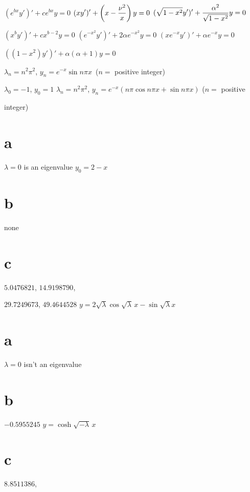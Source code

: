 \medskip

 $(e^{bx}y')'+ce^{bx}y=0$\;
 $\displaystyle{(xy')'+\left(x-\frac{\nu^{2}}{x}\right)y=0}$\;
 $\displaystyle{(\sqrt{1-x^{2}}y')'+\frac{\alpha^{2}}{\sqrt{1-x^{2}}}y=0}$

\smallskip

 $(x^{b}y')'+cx^{b-2}y=0$\;
 $(e^{-x^{2}}y')'+2\alpha e^{-x^{2}}y=0$\;
 $(xe^{-x}y')'+\alpha e^{-x}y=0$

\smallskip
{} $((1-x^{2})y')'+\alpha(\alpha+1)y=0$\;

\smallskip

  $\lambda_{n}=n^{2}\pi^{2}$,\;    $y_{n}=e^{-x}\sin n\pi x$\, ($n=$
positive integer)

\smallskip

 $\lambda_{0}=-1$, $y_{0}=1$   $\lambda_{n}=n^{2}\pi^{2}$,
$y_{n}=e^{-x}(n\pi\cos n\pi x+\sin n\pi x)$  ($n=$ positive

\quad \quad  integer)

\smallskip

 \part{a} $\lambda=0$ is an eigenvalue   $y_{0}=2-x$\;
\part{b} none\;    \part{c} $5.0476821$, $14.9198790$,

\quad \quad
$29.7249673$,
$49.4644528$   $y=2\sqrt{\lambda}\cos\sqrt{\lambda}\,x-\sin\sqrt{\lambda}x$

\smallskip

 \part{a} $\lambda=0$ isn't  an eigenvalue\;   \part{b}
 $-0.5955245$   $y=\cosh\sqrt{-\lambda}\,x$\;
\part{c} $8.8511386$,

